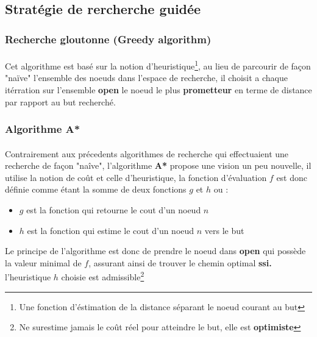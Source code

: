\subsection
{Stratégie de rercherche guidée}
\subsubsection{Recherche gloutonne (Greedy algorithm)}
\paragraph{}
Cet algorithme est basé sur la notion d'heuristique\footnote[1]{Une fonction d'éstimation de la distance séparant le noeud courant au but }, au lieu de parcourir de façon "naïve" l'ensemble des noeuds dans l'espace de recherche, il choisit a chaque itérration sur l'ensemble \textbf{open} le noeud le plus \textbf{prometteur} en terme de distance par rapport au but recherché.
\newpage
\subsubsection{Algorithme A*}
\paragraph{}
Contrairement aux précedents algorithmes de recherche qui effectuaient une recherche de façon "naîve", l'algorithme \textbf{A* }propose une vision un peu nouvelle, il utilise la notion de coût et celle d'heuristique, la fonction d'évaluation $f$ est donc définie comme étant la somme de deux fonctions $g$ et $h$ ou : \\
	\begin{itemize}
		\item $g$ est la fonction  qui retourne le cout d'un noeud $n$
		\item $h$ est la fonction  qui estime le cout d'un noeud $n$ vers le but
	\end{itemize} 
Le principe de l'algorithme est donc de prendre le noeud dans \textbf{open} qui possède la valeur minimal de $f$, assurant ainsi de trouver le chemin optimal \textbf{ssi.} l'heuristique $h$ choisie est admissible\footnote[2]{Ne surestime jamais le coût réel pour atteindre le but, elle est \textbf{optimiste}}

